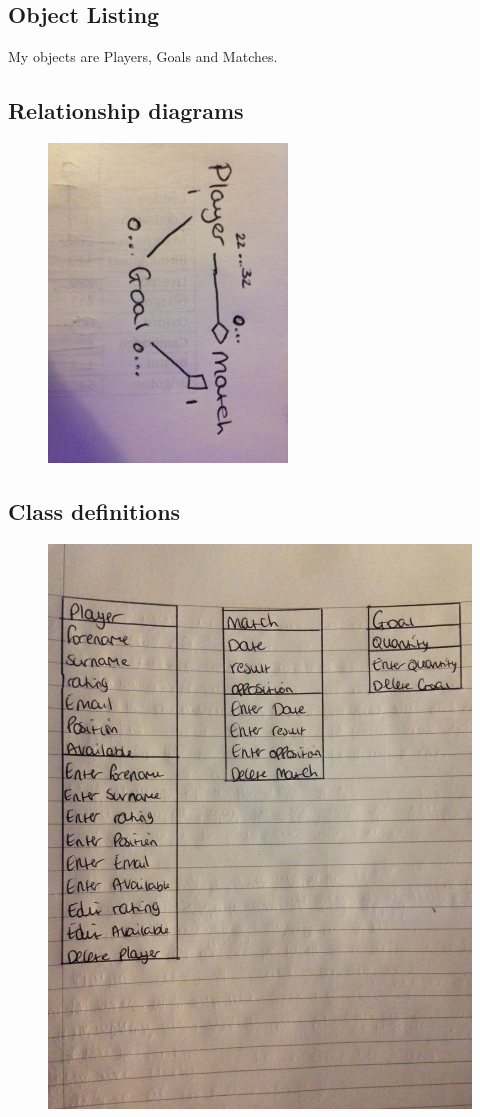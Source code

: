 \subsection{Object Listing}
 My objects are Players, Goals and Matches. 
\subsection{Relationship diagrams}
\begin{figure}[H]
	\includegraphics{class diagram}
\end{figure}

\subsection{Class definitions}
\begin{figure}[H]
	\includegraphics{class def}
\end{figure}


